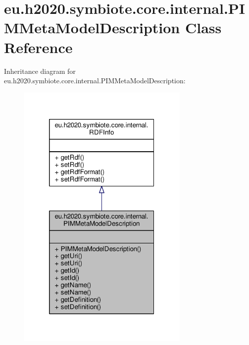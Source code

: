 \hypertarget{classeu_1_1h2020_1_1symbiote_1_1core_1_1internal_1_1PIMMetaModelDescription}{}\section{eu.\+h2020.\+symbiote.\+core.\+internal.\+P\+I\+M\+Meta\+Model\+Description Class Reference}
\label{classeu_1_1h2020_1_1symbiote_1_1core_1_1internal_1_1PIMMetaModelDescription}


Inheritance diagram for eu.\+h2020.\+symbiote.\+core.\+internal.\+P\+I\+M\+Meta\+Model\+Description\+:\nopagebreak
\begin{figure}[H]
\begin{center}
\leavevmode
\includegraphics[width=236pt]{classeu_1_1h2020_1_1symbiote_1_1core_1_1internal_1_1PIMMetaModelDescription__inherit__graph}
\end{center}
\end{figure}


